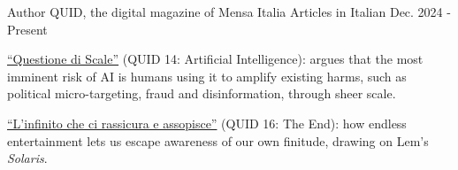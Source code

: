 

\begin{cventries}

  \cventry
    {Author} %
    {QUID, the digital magazine of Mensa Italia} %
    {Articles in Italian} %
    {Dec. 2024 - Present} %
    {
      \begin{cvitems} %
        \item {\href{https://quid.mensa.it/numeri/quid-14-intelligenza-artificiale/questione-di-scale/}{“Questione di Scale”} (QUID 14: Artificial Intelligence): argues that the most imminent risk of AI is humans using it to amplify existing harms, such as political micro-targeting, fraud and disinformation, through sheer scale.}
        \item {\href{https://quid.mensa.it/numeri/quid-16-la-fine/linfinito-che-ci-rassicura-e-assopisce/}{“L’infinito che ci rassicura e assopisce”} (QUID 16: The End): how endless entertainment lets us escape awareness of our own finitude, drawing on Lem's \textit{Solaris}.}
      \end{cvitems}
    }

\end{cventries}
